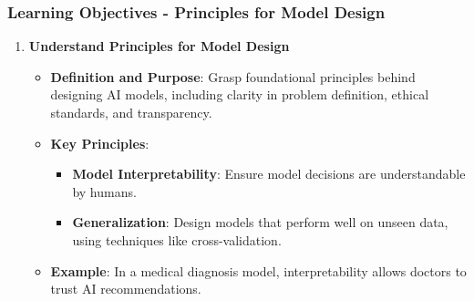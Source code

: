 \documentclass[aspectratio=169]{beamer}
\begin{document}
\begin{frame}[fragile]
    \frametitle{Learning Objectives - Principles for Model Design}
    \begin{enumerate}
        \item \textbf{Understand Principles for Model Design}
        \begin{itemize}
            \item \textbf{Definition and Purpose}: Grasp foundational principles behind designing AI models, including clarity in problem definition, ethical standards, and transparency.
            \item \textbf{Key Principles}:
            \begin{itemize}
                \item \textbf{Model Interpretability}: Ensure model decisions are understandable by humans.
                \item \textbf{Generalization}: Design models that perform well on unseen data, using techniques like cross-validation.
            \end{itemize}
            \item \textbf{Example}: In a medical diagnosis model, interpretability allows doctors to trust AI recommendations.
        \end{itemize}
    \end{enumerate}
\end{frame}
\end{document}
